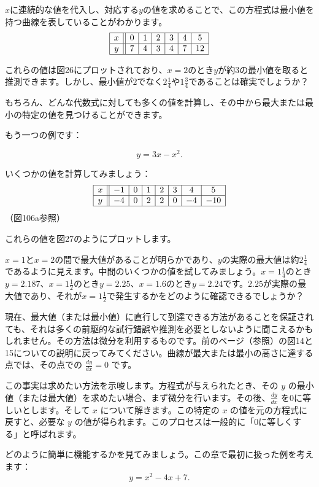 \documentclass[a4paper,11pt,openany]{ltjsbook}
\begin{document}
$x$に連続的な値を代入し、対応する$y$の値を求めることで、この方程式は最小値を持つ曲線を表していることがわかります。
\[
\begin{array}{|c||c|c|c|c|c|c|}
\hline
x & 0 & 1 & 2 & 3 & 4 & 5 \\
\hline
y & 7 & 4 & 3 & 4 & 7 & 12 \\
\hline
\end{array}
\]

これらの値は図26にプロットされており、$x = 2$のとき$y$が約3の最小値を取ると推測できます。しかし、最小値が$2$でなく$2 \frac{1}{4}$や$1 \frac{3}{4}$であることは確実でしょうか？

もちろん、どんな代数式に対しても多くの値を計算し、その中から最大または最小の特定の値を見つけることができます。

もう一つの例です：

\[
y = 3x - x^2.
\]

いくつかの値を計算してみましょう：
\[
\begin{array}{|c||c|c|c|c|c|c|c|}
\hline
x & -1 & 0 & 1 & 2 & 3 & 4 & 5 \\
\hline
y & -4 & 0 & 2 & 2 & 0 & -4 & -10 \\
\hline
\end{array}
\]
（図106a参照）

これらの値を図27のようにプロットします。

$x = 1$と$x = 2$の間で最大値があることが明らかであり、$y$の実際の最大値は約$2 \frac{1}{4}$であるように見えます。中間のいくつかの値を試してみましょう。$x = 1 \frac{1}{4}$のとき$y = 2.187$、$x = 1 \frac{1}{2}$のとき$y = 2.25$、$x = 1.6$のとき$y = 2.24$です。$2.25$が実際の最大値であり、それが$x = 1 \frac{1}{2}$で発生するかをどのように確認できるでしょうか？

現在、最大値（または最小値）に直行して到達できる方法があることを保証されても、それは多くの前駆的な試行錯誤や推測を必要としないように聞こえるかもしれません。その方法は微分を利用するものです。前のページ（\pageref{curve}参照）の図14と15についての説明に戻ってみてください。曲線が最大または最小の高さに達する点では、その点での \(\frac{dy}{dx} = 0\) です。

この事実は求めたい方法を示唆します。方程式が与えられたとき、その \(y\) の最小値（または最大値）を求めたい場合、まず微分を行います。その後、\(\frac{dy}{dx}\) を0に等しいとします。そして \(x\) について解きます。この特定の \(x\) の値を元の方程式に戻すと、必要な \(y\) の値が得られます。このプロセスは一般的に「0に等しくする」と呼ばれます。

どのように簡単に機能するかを見てみましょう。この章で最初に扱った例を考えます：
\[
y = x^2 - 4x + 7.
\]
\end{document}
